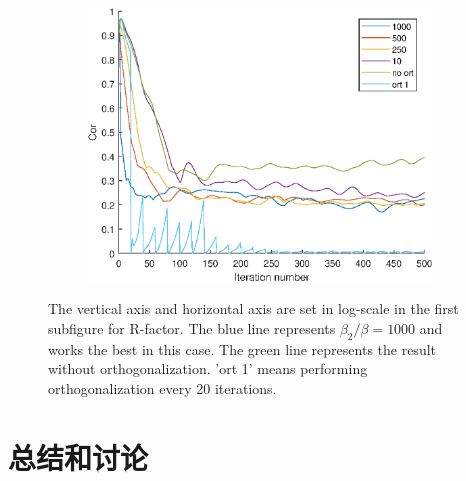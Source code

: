 \documentclass[UTF8]{beamer}
\begin{document}
\begin{frame}
\begin{figure}
\begin{subfigure}{.3\textwidth}
			\label{fig:ort_snr}
		\end{subfigure}
		\begin{subfigure}{.3\textwidth}
			\centering
			\includegraphics[width=1\linewidth]{../figures/ort_cor.eps}  
			\label{fig:ort_cor}
		\end{subfigure}
		\caption{The vertical axis and horizontal axis are set in log-scale in the first subfigure for R-factor. The blue line represents $\beta_2/\beta=1000$ and works the best in this case. The green line represents the result without orthogonalization. 'ort 1' means performing orthogonalization every 20 iterations. }
		\label{fig:ort}
	\end{figure}
	
	
\end{frame}

\section{总结和讨论}
\end{document}
